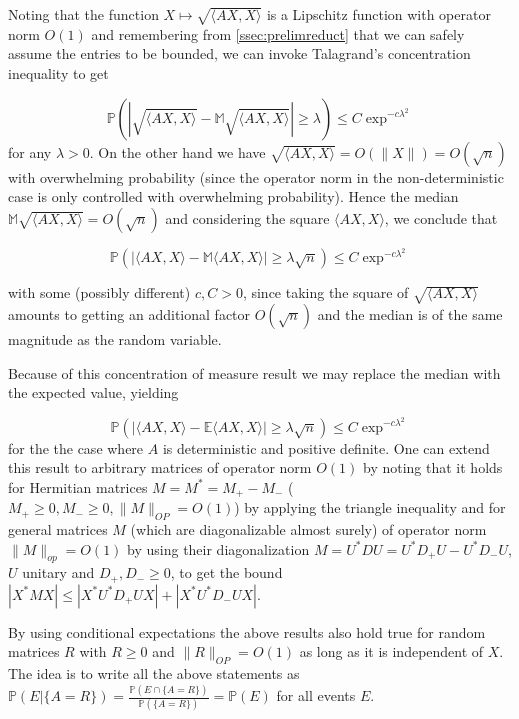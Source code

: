 Noting that the function $X\mapsto \sqrt{\langle AX,X\rangle}$ is a Lipschitz function with operator norm $O(1)$ and remembering from \ref{ssec:prelimreduct} that we can safely assume the entries to be bounded, we can invoke Talagrand's concentration inequality to get 

$$\mathbb P(|\sqrt{\langle AX,X\rangle}-\mathbb M\sqrt{\langle AX,X\rangle}|\geq\lambda)\leq C\exp^{-c\lambda^2}$$
for any $\lambda>0$. On the other hand we have $\sqrt{\langle AX,X\rangle}=O(\|X\|)=O(\sqrt n)$ with overwhelming probability (since the operator norm in the non-deterministic case is only controlled with overwhelming probability). Hence the median $\mathbb M\sqrt{\langle AX,X\rangle}=O(\sqrt n)$ and considering the square $\langle AX,X\rangle$, we conclude that

$$\mathbb P(|\langle AX,X\rangle-\mathbb M\langle AX,X\rangle|\geq\lambda\sqrt n)\leq C\exp^{-c\lambda^2}$$

with some (possibly different) $c,C>0$, since taking the square of \newline$\sqrt{\langle AX,X\rangle}$ amounts to getting an additional factor $O(\sqrt n)$ and the median is of the same magnitude as the random variable.

Because of this concentration of measure result we may replace the median with the expected value, yielding

\begin{equation}\label{eq:concentrationOfXRXAroundTrR}
	\mathbb P(|\langle AX,X\rangle-\mathbb E\langle AX,X\rangle|\geq\lambda\sqrt n)\leq C\exp^{-c\lambda^2}
\end{equation}
for the the case where $A$ is deterministic and positive definite. One can extend this result to arbitrary matrices of operator norm $O(1)$ by noting that it holds for Hermitian matrices $M=M^*=M_+-M_-$ ($M_+\geq 0,M_-\geq 0,\|M\|_{OP}=O(1)$) by applying the triangle inequality and for general matrices $M$ (which are diagonalizable almost surely) of operator norm $\|M\|_{op}=O(1)$ by using their diagonalization $M=U^*DU=U^*D_+U-U^*D_-U$, $U$ unitary and $D_+,D_-\geq 0$, to get the bound $|X^*MX|\leq|X^*U^*D_+UX|+|X^*U^*D_-UX|$.

\begin{remark}\label{rem:conditionalExpectationForDeterministicResult}
	By using conditional expectations the above results also hold true for random matrices $R$ with $R\geq 0$ and $\|R\|_{OP}=O(1)$ as long as it is independent of $X$. The idea is to write all the above statements as $\mathbb P(E|\{A=R\})=\frac{\mathbb P(E\cap\{A=R\})}{\mathbb P(\{A=R\})}=\mathbb P(E)$ for all events $E$.
\end{remark}

